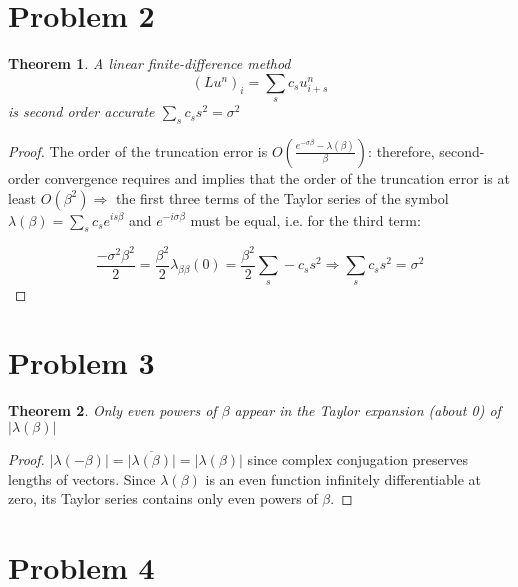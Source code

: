 \documentclass[a4paper]{amsproc}
\theoremstyle{plain}
\newtheorem*{thm}{Theorem}
\theoremstyle{definition}
\theoremstyle{remark}
\numberwithin{equation}{section}
\begin{document}
\section*{Problem 2}

\begin{thm} \label{some label} 
A linear finite-difference method $$(Lu^n)_i = \sum\limits_{s} c_s u^{n}_{i+s}$$ is second order accurate $\sum\limits_{s} c_s s^2 = \sigma^2$ 
\end{thm}

\begin{proof}

The order of the truncation error is $ O(\frac{e^{-\sigma\beta} - \lambda(\beta)}{\beta})$: therefore, second-order convergence requires and implies that the order of the truncation error is at least $O(\beta^2) \Longrightarrow$ the first three terms of the Taylor series of the symbol $\lambda(\beta) = \sum\limits_{s} c_s e^{is\beta}$ and $e^{-i\sigma\beta}$ must be equal, i.e. for the third term:

\begin{equation}\label{eq:2.1}  
\frac{-\sigma^2\beta^2}{2} = \frac{\beta^2}{2}\lambda_{\beta\beta}(0) = \frac{\beta^2}{2}\sum\limits_{s} -c_s s^2 \Longrightarrow \sum\limits_{s} c_s s^2 = \sigma^2
\end{equation}

\end{proof}

\section*{Problem 3}

\begin{thm} \label{some label}
Only even powers of $\beta$ appear in the Taylor expansion (about 0) of $\lvert \lambda(\beta) \rvert$
\end{thm}

\begin{proof}
$\lvert \lambda(-\beta) \rvert = \lvert \overline{\lambda(\beta)} \rvert = \lvert \lambda(\beta) \rvert$ since complex conjugation preserves lengths of vectors. Since $\lambda(\beta)$ is an even function infinitely differentiable at zero, its Taylor series contains only even powers of $\beta$.
\end{proof}

\section*{Problem 4}
\end{document}
